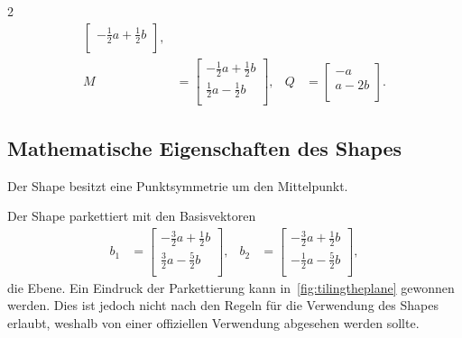 \documentclass[twoside,fontsize=brochure]{tudcdreprt}
\begin{document}
\begin{multicols*}{2}
\begin{align}
\begin{bmatrix}
    -\frac{1}{2} a + \frac{1}{2}b \\
  \end{bmatrix}, \\
  M &= \begin{bmatrix}
    -\frac{1}{2} a + \frac{1}{2}b \\
     \frac{1}{2} a - \frac{1}{2}b \\
  \end{bmatrix}, &
  Q &= \begin{bmatrix}
    -a \\
    a - 2b \\
  \end{bmatrix}.
\end{align}

\subsection{Mathematische Eigenschaften des Shapes}

Der Shape besitzt eine Punktsymmetrie um den Mittelpunkt.

Der Shape parkettiert mit den Basisvektoren
\begin{align}
  b_1 &= \begin{bmatrix}
    -\frac{3}{2}a+\frac{1}{2}b \\
    \frac{3}{2}a - \frac{5}{2}b \\
  \end{bmatrix}, &
  b_2 &= \begin{bmatrix}
    -\frac{3}{2}a + \frac{1}{2}b \\
     -\frac{1}{2}a - \frac{5}{2}b \\
  \end{bmatrix},
\end{align} die Ebene. Ein Eindruck der Parkettierung
kann in~\ref{fig:tilingtheplane} gewonnen werden.
Dies ist jedoch nicht nach den Regeln für die Verwendung
des Shapes erlaubt, weshalb von einer offiziellen Verwendung
abgesehen werden sollte.

\begin{figure}[H]
  \centering
\end{figure}
\end{multicols*}
\end{document}
